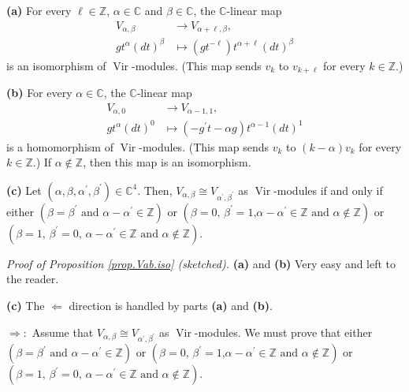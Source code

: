 \documentclass[etingof-lie.tex]{subfiles}
\begin{document}
\begin{proposition}
\label{prop.Vab.iso}\textbf{(a)} For every $\ell\in\mathbb{Z}$, $\alpha
\in\mathbb{C}$ and $\beta\in\mathbb{C}$, the $\mathbb{C}$-linear map%
\begin{align*}
V_{\alpha,\beta}  &  \rightarrow V_{\alpha+\ell,\beta},\\
gt^{\alpha}\left(  dt\right)  ^{\beta}  &  \mapsto\left(  gt^{-\ell}\right)
t^{\alpha+\ell}\left(  dt\right)  ^{\beta}%
\end{align*}
is an isomorphism of $\operatorname*{Vir}$-modules. (This map sends $v_{k}$ to
$v_{k+\ell}$ for every $k\in\mathbb{Z}$.)

\textbf{(b)} For every $\alpha\in\mathbb{C}$, the $\mathbb{C}$-linear map%
\begin{align*}
V_{\alpha,0}  &  \rightarrow V_{\alpha-1,1},\\
gt^{\alpha}\left(  dt\right)  ^{0}  &  \mapsto\left(  -g^{\prime}t-\alpha
g\right)  t^{\alpha-1}\left(  dt\right)  ^{1}%
\end{align*}
is a homomorphism of $\operatorname*{Vir}$-modules. (This map sends $v_{k}$ to
$\left(  k-\alpha\right)  v_{k}$ for every $k\in\mathbb{Z}$.) If $\alpha
\notin\mathbb{Z}$, then this map is an isomorphism.

\textbf{(c)} Let $\left(  \alpha,\beta,\alpha^{\prime},\beta^{\prime}\right)
\in\mathbb{C}^{4}$. Then, $V_{\alpha,\beta}\cong V_{\alpha^{\prime}%
,\beta^{\prime}}$ as $\operatorname*{Vir}$-modules if and only if either
$\left(  \beta=\beta^{\prime}\text{ and }\alpha-\alpha^{\prime}\in
\mathbb{Z}\right)  $ or $\left(  \beta=0\text{, }\beta^{\prime}=1\text{,
}\alpha-\alpha^{\prime}\in\mathbb{Z}\text{ and }\alpha\notin\mathbb{Z}\right)
$ or $\left(  \beta=1\text{, }\beta^{\prime}=0\text{, }\alpha-\alpha^{\prime
}\in\mathbb{Z}\text{ and }\alpha\notin\mathbb{Z}\right)  $.
\end{proposition}

\textit{Proof of Proposition \ref{prop.Vab.iso} (sketched).} \textbf{(a)} and
\textbf{(b)} Very easy and left to the reader.

\textbf{(c)} The $\Longleftarrow$ direction is handled by parts \textbf{(a)}
and \textbf{(b)}.

$\Longrightarrow:$ Assume that $V_{\alpha,\beta}\cong V_{\alpha^{\prime}%
,\beta^{\prime}}$ as $\operatorname*{Vir}$-modules. We must prove that either
$\left(  \beta=\beta^{\prime}\text{ and }\alpha-\alpha^{\prime}\in
\mathbb{Z}\right)  $ or $\left(  \beta=0\text{, }\beta^{\prime}=1\text{,
}\alpha-\alpha^{\prime}\in\mathbb{Z}\text{ and }\alpha\notin\mathbb{Z}\right)
$ or $\left(  \beta=1\text{, }\beta^{\prime}=0\text{, }\alpha-\alpha^{\prime
}\in\mathbb{Z}\text{ and }\alpha\notin\mathbb{Z}\right)  $.
\end{document}
